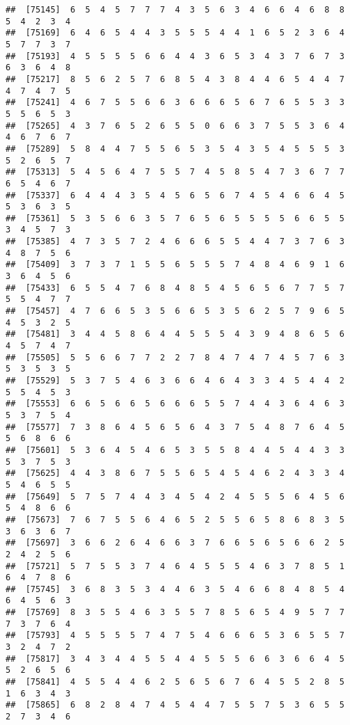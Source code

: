 \documentclass[
]{book}
\begin{document}
\begin{verbatim}
##  [75145]  6  5  4  5  7  7  7  4  3  5  6  3  4  6  6  4  6  8  8  5  4  2  3  4
##  [75169]  6  4  6  5  4  4  3  5  5  5  4  4  1  6  5  2  3  6  4  5  7  7  3  7
##  [75193]  4  5  5  5  5  6  6  4  4  3  6  5  3  4  3  7  6  7  3  6  3  6  4  8
##  [75217]  8  5  6  2  5  7  6  8  5  4  3  8  4  4  6  5  4  4  7  4  7  4  7  5
##  [75241]  4  6  7  5  5  6  6  3  6  6  6  5  6  7  6  5  5  3  3  5  5  6  5  3
##  [75265]  4  3  7  6  5  2  6  5  5  0  6  6  3  7  5  5  3  6  4  4  6  7  6  7
##  [75289]  5  8  4  4  7  5  5  6  5  3  5  4  3  5  4  5  5  5  3  5  2  6  5  7
##  [75313]  5  4  5  6  4  7  5  5  7  4  5  8  5  4  7  3  6  7  7  6  5  4  6  7
##  [75337]  6  4  4  4  3  5  4  5  6  5  6  7  4  5  4  6  6  4  5  5  3  6  3  5
##  [75361]  5  3  5  6  6  3  5  7  6  5  6  5  5  5  5  6  6  5  5  3  4  5  7  3
##  [75385]  4  7  3  5  7  2  4  6  6  6  5  5  4  4  7  3  7  6  3  4  8  7  5  6
##  [75409]  3  7  3  7  1  5  5  6  5  5  5  7  4  8  4  6  9  1  6  3  6  4  5  6
##  [75433]  6  5  5  4  7  6  8  4  8  5  4  5  6  5  6  7  7  5  7  5  5  4  7  7
##  [75457]  4  7  6  6  5  3  5  6  6  5  3  5  6  2  5  7  9  6  5  4  5  3  2  5
##  [75481]  3  4  4  5  8  6  4  4  5  5  5  4  3  9  4  8  6  5  6  4  5  7  4  7
##  [75505]  5  5  6  6  7  7  2  2  7  8  4  7  4  7  4  5  7  6  3  5  3  5  3  5
##  [75529]  5  3  7  5  4  6  3  6  6  4  6  4  3  3  4  5  4  4  2  5  5  4  5  3
##  [75553]  6  6  5  6  6  5  6  6  6  5  5  7  4  4  3  6  4  6  3  5  3  7  5  4
##  [75577]  7  3  8  6  4  5  6  5  6  4  3  7  5  4  8  7  6  4  5  5  6  8  6  6
##  [75601]  5  3  6  4  5  4  6  5  3  5  5  8  4  4  5  4  4  3  3  5  3  7  5  3
##  [75625]  4  4  3  8  6  7  5  5  6  5  4  5  4  6  2  4  3  3  4  5  4  6  5  5
##  [75649]  5  7  5  7  4  4  3  4  5  4  2  4  5  5  5  6  4  5  6  5  4  8  6  6
##  [75673]  7  6  7  5  5  6  4  6  5  2  5  5  6  5  8  6  8  3  5  3  6  3  6  7
##  [75697]  3  6  6  2  6  4  6  6  3  7  6  6  5  6  5  6  6  2  5  2  4  2  5  6
##  [75721]  5  7  5  5  3  7  4  6  4  5  5  5  4  6  3  7  8  5  1  6  4  7  8  6
##  [75745]  3  6  8  3  5  3  4  4  6  3  5  4  6  6  8  4  8  5  4  6  4  5  6  3
##  [75769]  8  3  5  5  4  6  3  5  5  7  8  5  6  5  4  9  5  7  7  7  3  7  6  4
##  [75793]  4  5  5  5  5  7  4  7  5  4  6  6  6  5  3  6  5  5  7  3  2  4  7  2
##  [75817]  3  4  3  4  4  5  5  4  4  5  5  5  6  6  3  6  6  4  5  5  2  6  5  6
##  [75841]  4  5  5  4  4  6  2  5  6  5  6  7  6  4  5  5  2  8  5  1  6  3  4  3
##  [75865]  6  8  2  8  4  7  4  5  4  4  7  5  5  7  5  3  6  5  5  2  7  3  4  6

\end{verbatim}
\end{document}

